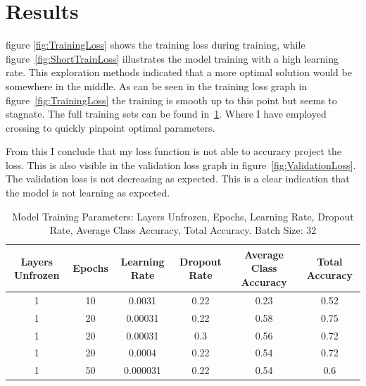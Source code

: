 \documentclass{article}
\begin{document}
\section{Results}

figure \ref{fig:TrainingLoss} shows the training loss during training, while figure~\ref{fig:ShortTrainLoss} illustrates the model training with a high learning rate. This exploration methods indicated that a more optimal solution would be somewhere in the middle. As can be seen in the training loss graph in figure~\ref{fig:TrainingLoss} the training is smooth up to this point but seems to stagnate. The full training sets can be found in~\ref{tab:model_parameters}. Where I have employed crossing to quickly pinpoint optimal parameters. 

From this I conclude that my loss function is not able to accuracy project the loss. This is also visible in the validation loss graph in figure~\ref{fig:ValidationLoss}. The validation loss is not decreasing as expected. This is a clear indication that the model is not learning as expected.

\begin{table}[ht]
    \centering
    \begin{tabular}{cccccc}
    \hline
    \textbf{Layers Unfrozen} & \textbf{Epochs} & \textbf{Learning Rate} & \textbf{Dropout Rate} & \textbf{Average Class Accuracy} & \textbf{Total Accuracy} \\
    \hline
    1 & 10 & 0.0031 & 0.22 & 0.23 & 0.52 \\
    1 & 20 & 0.00031 & 0.22 & 0.58 & 0.75 \\
    1 & 20 & 0.00031 & 0.3 & 0.56 & 0.72 \\
    1 & 20 & 0.0004 & 0.22 & 0.54 & 0.72 \\
    1 & 50 & 0.000031 & 0.22 & 0.54 & 0.6 \\
    \hline
    \end{tabular}
    \caption{Model Training Parameters: Layers Unfrozen, Epochs, Learning Rate, Dropout Rate, Average Class Accuracy, Total Accuracy. Batch Size: 32}
    \label{tab:model_parameters}
\end{table}
\end{document}
